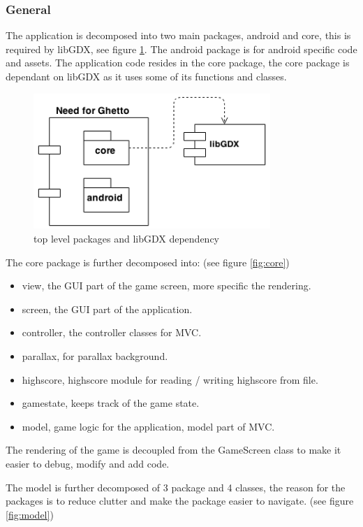\documentclass{article}
\begin{document}
\subsubsection{General}
The application is decomposed into two main packages, android and core, this is required by libGDX, see figure \ref{fig:nfg}. The android package is for android specific code and assets. The application code resides in the core package, the core package is dependant on libGDX as it uses some of its functions and classes.

\begin{figure}[h]
  \centering
  \includegraphics[width=0.8\textwidth]{nfg.png}
  \caption{top level packages and libGDX dependency}
  \label{fig:nfg}
\end{figure}

The core package is further decomposed into: (see figure \ref{fig:core})
\begin{itemize}
  \item view, the GUI part of the game screen, more specific the rendering.
  \item screen, the GUI part of the application.
  \item controller, the controller classes for MVC.
  \item parallax, for parallax background.
  \item highscore, highscore module for reading / writing highscore from file.
  \item gamestate, keeps track of the game state.
  \item model, game logic for the application, model part of MVC.
\end{itemize}

The rendering of the game is decoupled from the GameScreen class to make it easier to debug, modify and add code.

The model is further decomposed of 3 package and 4 classes, the reason for the packages is to reduce clutter and make the package easier to navigate. (see figure \ref{fig:model})
\end{document}
